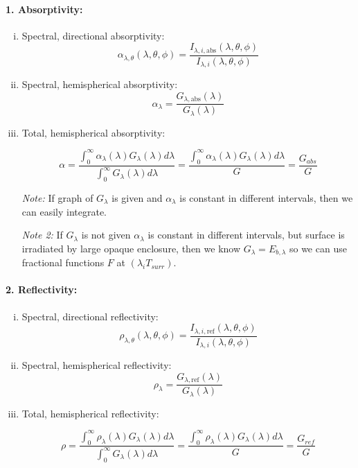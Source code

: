 \paragraph{1. Absorptivity:}
%
\begin{enumerate}[(i)]
    \item Spectral, directional absorptivity:
    \[
    \alpha_{\lambda,\theta}(\lambda,\theta,\phi) = \frac{I_{\lambda,i,\text{abs}}(\lambda,\theta,\phi)}{I_{\lambda,i}(\lambda,\theta,\phi)}
    \]

    \item Spectral, hemispherical absorptivity:
    \[
    \alpha_{\lambda} = \frac{G_{\lambda,\text{abs}}(\lambda)}{G_{\lambda}(\lambda)}
    \]

    \item     Total, hemispherical absorptivity:
    \textbf{}
    \begin{definition}    
    \[
    \alpha = \frac{\displaystyle\int_0^{\infty} \alpha_\lambda(\lambda) G_\lambda(\lambda) d \lambda}{\displaystyle\int_0^{\infty} G_\lambda(\lambda) d \lambda} = \frac{\displaystyle\int_0^{\infty} \alpha_\lambda(\lambda) G_\lambda(\lambda) d \lambda}{G} = \frac{G_{abs}}{G}
    \]
    
    \textbf{}
    
    \textit{Note: } If graph of $G_\lambda$ is given and $\alpha_\lambda$ is constant in different intervals, then we can easily integrate. 
    
    \textbf{}
    
    \textit{Note 2: }If $G_\lambda$ is not given $\alpha_\lambda$ is constant in different intervals, but surface is irradiated by large opaque enclosure, then we know $G_\lambda = E_{b,\lambda}$ so we can use fractional functions $F$ at $(\lambda_i T_{surr})$.
    \end{definition}

\end{enumerate}
%
\paragraph{2. Reflectivity:}
\begin{enumerate}[(i)]
    \item Spectral, directional reflectivity:
    \[
    \rho_{\lambda,\theta}(\lambda,\theta,\phi) = \frac{I_{\lambda,i,\text{ref}}(\lambda,\theta,\phi)}{I_{\lambda,i}(\lambda,\theta,\phi)}
    \]
    \item Spectral, hemispherical reflectivity:
    \[
    \rho_{\lambda} = \frac{G_{\lambda,\text{ref}}(\lambda)}{G_{\lambda}(\lambda)}
    \]
    
    \item  Total, hemispherical reflectivity:
    \textbf{}
    \begin{definition}
    \[
     \rho  = \frac{\displaystyle\int_0^{\infty} \rho_\lambda(\lambda) G_\lambda(\lambda) d \lambda}{\displaystyle\int_0^{\infty} G_\lambda(\lambda) d \lambda} = \frac{\displaystyle\int_0^{\infty} \rho_\lambda(\lambda) G_\lambda(\lambda) d \lambda}{G} =\frac{G_{ref}}{G}
    \]
    \end{definition}
\end{enumerate}


